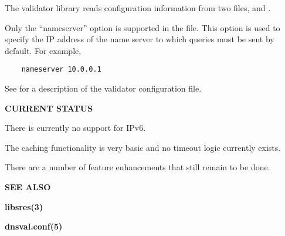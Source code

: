 The validator library reads configuration information from two files,
 and .

Only the ``nameserver'' option is supported in the  file.
This option is used to specify the IP address of the name server to which
queries must be sent by default.  For example,

\begin{verbatim}
    nameserver 10.0.0.1
\end{verbatim}

See  for a description of the validator configuration file.

{\bf CURRENT STATUS}

There is currently no support for IPv6.

The caching functionality is very basic and no timeout logic currently exists.

There are a number of feature enhancements that still remain to be done.

{\bf SEE ALSO}

{\bf libsres(3)}

{\bf dnsval.conf(5)}
